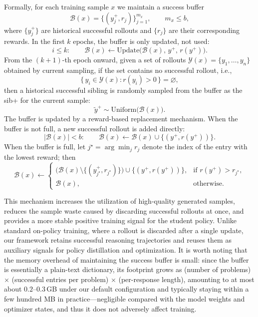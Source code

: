 \documentclass{article}
\begin{document}
Formally, for each training sample $x$ we maintain a success buffer
\begin{equation}
\mathcal{B}(x)=\{(y_j^+, r_j)\}_{j=1}^{m_x},
\qquad m_x \le b,
\end{equation}
where $\{y_j^+\}$ are historical successful rollouts and $\{r_j\}$ are their corresponding rewards. In the first $k$ epochs, the buffer is only updated, not used:
\begin{equation}
i \le k:\qquad
\mathcal{B}(x) \leftarrow \mathrm{Update}\big(\mathcal{B}(x),\, y^+,\, r(y^+)\big).
\end{equation}
From the $(k{+}1)$-th epoch onward, given a set of rollouts $\mathcal{Y}(x)=\{y_1,\dots,y_n\}$ obtained by current sampling, if the set contains no successful rollout, i.e.,
\begin{equation}
\{\,y_i \in \mathcal{Y}(x): r(y_i)>0\,\}=\varnothing,
\end{equation}
then a historical successful sibling is randomly sampled from the buffer as the sib+ for the current sample:
\begin{equation}
\tilde{y}^+ \sim \mathrm{Uniform}\big(\mathcal{B}(x)\big).
\end{equation}
The buffer is updated by a reward-based replacement mechanism. When the buffer is not full, a new successful rollout is added directly:
\begin{equation}
|\mathcal{B}(x)|<b:\qquad
\mathcal{B}(x) \leftarrow \mathcal{B}(x)\cup \{(y^+, r(y^+))\}.
\end{equation}
When the buffer is full, let $j^\star = \arg\min_j r_j$ denote the index of the entry with the lowest reward; then
\begin{equation}
\mathcal{B}(x) \leftarrow
\begin{cases}
\big(\mathcal{B}(x)\setminus \{(y_{j^\star}^+, r_{j^\star})\}\big)\cup \{(y^+, r(y^+))\},
& \text{if } r(y^+) > r_{j^\star}, \\[4pt]
\mathcal{B}(x),
& \text{otherwise}.
\end{cases}
\end{equation}

This mechanism increases the utilization of high-quality generated samples, reduces the sample waste caused by discarding successful rollouts at once, and provides a more stable positive training signal for the student policy. Unlike standard on-policy training, where a rollout is discarded after a single update, our framework retains successful reasoning trajectories and reuses them as auxiliary signals for policy distillation and optimization. It is worth noting that the memory overhead of maintaining the success buffer is small: since the buffer is essentially a plain-text dictionary, its footprint grows as (number of problems) $\times$ (successful entries per problem) $\times$ (per-response length), amounting to at most about $0.2$--$0.3$\,GB under our default configuration and typically staying within a few hundred MB in practice---negligible compared with the model weights and optimizer states, and thus it does not adversely affect training.
\end{document}
